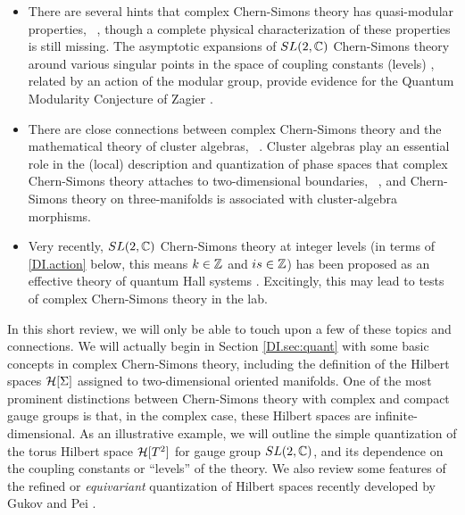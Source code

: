 \documentclass[12pt]{article}
\begin{document}
\begin{itemize}
The perturbative expansion of $SL(2,\BC)$ Chern-Simons theory on knot complements has been successfully reproduced  \cite{DIDF, DIGS-quant, DIBorotEynard} using the topological recursion of Eynard-Orantin \cite{DIEO}, a far-reaching formalism for the quantization of spectral curves.

The study of five-brane systems related to complex Chern-Simons theory recently led to a vast generalization of the Volume Conjecture, involving asymptotic limits of colored HOMFLY polynomials and their categorification \cite{DIFGS-VC}.


\item There are several hints that complex Chern-Simons theory has quasi-modular properties, \DIcf\ \cite{DIDG-Sdual, DIGPV}, though a complete physical characterization of these properties is still missing. The asymptotic expansions of $SL(2,\BC)$ Chern-Simons theory around various singular points in the space of coupling constants (levels) \cite{DIDG-levelk},
related by an action of the modular group, provide evidence for the Quantum Modularity Conjecture of Zagier \cite{DIQMF}.

\item There are close connections between complex Chern-Simons theory and the mathematical theory of cluster algebras, \DIcf\ \cite{DITY-cluster, DIDGG-Kdec}. Cluster algebras play an essential role in the (local) description and quantization of phase spaces that complex Chern-Simons theory attaches to two-dimensional boundaries, \DIcf\ \cite{DIFockChekhov, DIKash-Teich, DIFG-cluster}, and Chern-Simons theory on three-manifolds is associated with cluster-algebra morphisms.


\item Very recently, $SL(2,\BC)$ Chern-Simons theory at integer levels (in terms of \eqref{DI.action} below, this means $k\in {\mathbb Z}$ and $is\in {\mathbb Z}$)  has been proposed as an effective theory of quantum Hall systems \cite{DIVafa-FQHE}. Excitingly, this may lead to tests of complex Chern-Simons theory in the lab.

\end{itemize}



In this short review, we will only be able to touch upon a few of these topics and connections.
We will actually begin in Section \ref{DI.sec:quant} with some basic concepts in complex Chern-Simons theory, including the definition of the Hilbert spaces $\mathcal{H}[\Sigma]$ assigned to two-dimensional oriented manifolds. One of the most prominent distinctions between Chern-Simons theory with complex and compact gauge groups is that, in the complex case, these Hilbert spaces are infinite-dimensional. As an illustrative example, we will outline the simple quantization of the torus Hilbert space $\mathcal{H}[T^2]$ for gauge group $SL(2,\BC)$, and its dependence on the coupling constants or ``levels'' of the theory. We also review some features of the refined or \emph{equivariant} quantization of Hilbert spaces recently developed by Gukov and Pei \cite{DIGukovPei}.
\end{document}
